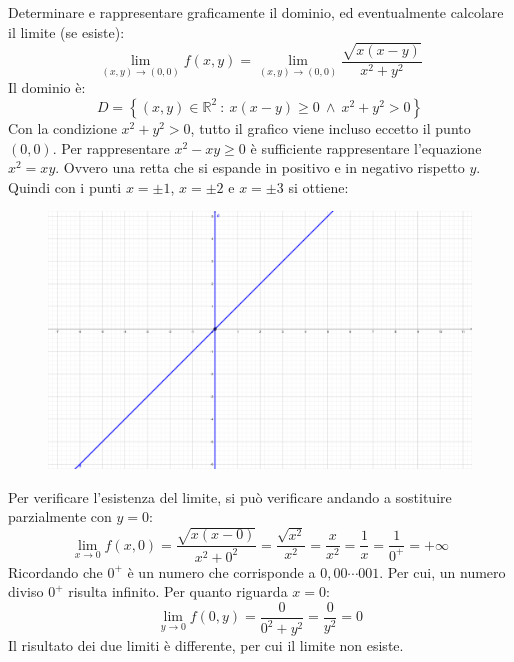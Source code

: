 \documentclass[a4paper]{article}
\begin{document}
	\noindent
	Determinare e rappresentare graficamente il dominio, ed eventualmente calcolare il limite (se esiste):
	\begin{equation*}
		\displaystyle\lim_{\left(x,y\right) \rightarrow \left(0,0\right)} f\left(x,y\right) = \displaystyle\lim_{\left(x,y\right) \rightarrow \left(0,0\right)} \dfrac{\sqrt{x\left(x-y\right)}}{x^{2}+y^{2}}
	\end{equation*}
	Il dominio è:
	\begin{equation*}
		D = \left\{\left(x,y\right) \in \mathbb{R}^{2} \: : \: x\left(x-y\right) \ge 0 \: \land \: x^{2}+y^{2} > 0\right\}
	\end{equation*}
	Con la condizione $x^{2}+y^{2} > 0$, tutto il grafico viene incluso eccetto il punto $\left(0,0\right)$. Per rappresentare $x^2 -xy \ge 0$ è sufficiente rappresentare l'equazione $x^{2} = xy$. Ovvero una retta che si espande in positivo e in negativo rispetto $y$. Quindi con i punti $x = \pm 1$, $x = \pm 2$ e $x = \pm 3$ si ottiene:
	\begin{figure}[!htp]
		\centering
		\includegraphics[width=.7\textwidth]{img/limiti-1.pdf}
	\end{figure}

	\noindent
	Per verificare l'esistenza del limite, si può verificare andando a sostituire parzialmente con $y = 0$:
	\begin{equation*}
		\displaystyle\lim_{x \rightarrow 0} f\left(x,0\right) = \dfrac{\sqrt{x\left(x-0\right)}}{x^{2}+0^{2}} = \dfrac{\sqrt{x^{2}}}{x^{2}} = \dfrac{x}{x^{2}} = \dfrac{1}{x} = \dfrac{1}{0^{+}} = +\infty
	\end{equation*}
	Ricordando che $0^{+}$ è un numero che corrisponde a $0,00\cdots001$. Per cui, un numero diviso $0^{+}$ risulta infinito. Per quanto riguarda $x = 0$:
	\begin{equation*}
		\displaystyle\lim_{y \rightarrow 0} f\left(0,y\right) = \dfrac{0}{0^{2} + y^{2}} = \dfrac{0}{y^{2}} = 0
	\end{equation*}
	Il risultato dei due limiti è differente, per cui il limite non esiste.\newpage
\end{document}
